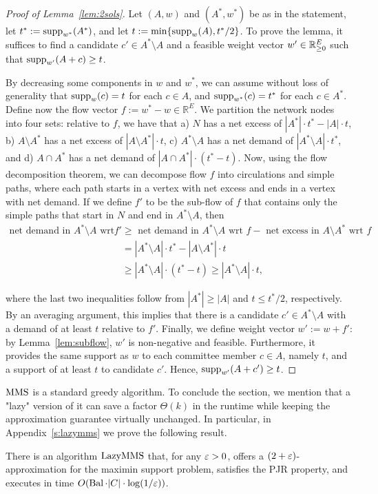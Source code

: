 \begin{proof}[Proof of Lemma~\ref{lem:2sols}]
Let $(A,w)$ and $(A^*, w^*)$ be as in the statement, let $t^*:=\operatorname{supp}_{w^*}(A^*)$, and let $t:=\min\{\operatorname{supp}_w(A), t^*/2\}$. To prove the lemma, it suffices to find a candidate $c'\in A^*\setminus A$ and a feasible weight vector $w'\in\mathbb{R}_{\geq 0}^E$ such that $\operatorname{supp}_{w'}(A+c)\geq t$.

By decreasing some components in $w$ and $w^*$, we can assume without loss of generality that $\operatorname{supp}_w(c)=t$ for each $c\in A$, and $\operatorname{supp}_{w^*}(c)=t^*$ for each $c\in A^*$. Define now the flow vector $f:=w^* - w\in\mathbb{R}^E$. 
We partition the network nodes into four sets: relative to $f$, we have that a) $N$ has a net excess of $|A^*|\cdot t^* - |A|\cdot t$, b) $A\setminus A^*$ has a net excess of $|A\setminus A^*|\cdot t$, c) $A^*\setminus A$ has a net demand of $|A^*\setminus A|\cdot t^*$, and d) $A\cap A^*$ has a net demand of $|A\cap A^*|\cdot (t^*-t)$.
Now, using the flow decomposition theorem, we can decompose flow $f$ into circulations and simple paths, where each path starts in a vertex with net excess and ends in a vertex with net demand. If we define $f'$ to be the sub-flow of $f$ that contains only the simple paths that start in $N$ and end in $A^*\setminus A$, then %
%
\begin{align*}
    \text{net demand in $A^*\setminus A$ wrt } f' &\geq \text{ net demand in $A^*\setminus A$ wrt } f - \text{ net excess in $A\setminus A^*$ wrt } f\\
    &= |A^*\setminus A|\cdot t^* - |A\setminus A^*|\cdot t\\
    &\geq |A^*\setminus A|\cdot (t^*-t) \geq |A^*\setminus A|\cdot t,
\end{align*}

where the last two inequalities follow from $|A^*|\geq |A|$ and $t\leq t^*/2$, respectively. By an averaging argument, this implies that there is a candidate $c'\in A^*\setminus A$ with a demand of at least $t$ relative to $f'$.
Finally, we define weight vector $w':=w+f'$: by Lemma~\ref{lem:subflow}, $w'$ is non-negative and feasible. 
Furthermore, it provides the same support as $w$ to each committee member $c\in A$, namely $t$, and a support of at least $t$ to candidate $c'$. Hence, $\operatorname{supp}_{w'}(A+c')\geq t$. 
\end{proof}

$\operatorname{MMS}$ is a standard greedy algorithm. 
To conclude the section, we mention that a "lazy" version of it can save a factor $\Theta(k)$ in the runtime while keeping the approximation guarantee virtually unchanged. 
In particular, in Appendix~\ref{s:lazymms} we prove the following result.

\begin{theorem}\label{thm:2eps}
There is an algorithm $\operatorname{LazyMMS}$ that, for any $\varepsilon>0$, offers a $(2+\varepsilon)$-approximation for the maximin support problem, satisfies the PJR property, and executes in time $O(\operatorname{Bal}\cdot |C|\cdot \log(1/\varepsilon))$.
\end{theorem}

